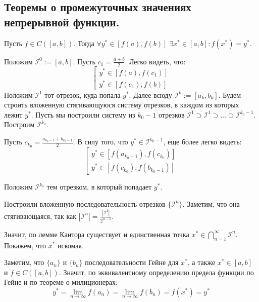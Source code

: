 \subsection{Теоремы о промежуточных значениях непрерывной функции.}

 Пусть $f \in C([a, b])$. 
Тогда $\forall y^* \in \left[f(a), f(b)\right] \; \exists x^* \in [a, b]: f(x^*) = y^*$.

\Proof

Положим $\mathcal{I}^0 := [a, b]$. Пусть $c_1 = \frac{a + b}{2}$. Легко видеть, что:
\begin{equation*}
    \left[
    \begin{array}{l}
        y^* \in [f(a), f(c_1)] \\
        y^* \in [f(c_1), f(b)]
    \end{array}
    \right.
\end{equation*}
Положим $\mathcal{I}^1$ тот отрезок, куда попала $y^*$. Далее всюду $\mathcal{I}^k := [a_k, b_k]$. 
Будем строить вложенную стягивающуюся систему отрезков, в каждом из которых лежит $y^*$.
Пусть мы построили систему из $k_0 - 1$ отрезков $\mathcal{I}^1 \supset \mathcal{I}^1 \supset \dots \supset \mathcal{I}^{k_0 - 1}$. Построим $\mathcal{I}^{k_0}$.

Пусть $c_{k_0} = \frac{a_{k_0 - 1} + b_{k_0 - 1}}{2}$. В силу того, что $y^* \in \mathcal{I}^{k_0 - 1}$, еще более легко видеть:
\begin{equation*}
    \left[
    \begin{array}{l}
        y^* \in [f(a_{k_0 - 1}), f(c_{k_0})] \\
        y^* \in [f(c_{k_0}), f(b_{k_0 - 1})]
    \end{array}
    \right.
\end{equation*}

Положим $\mathcal{I}^{k_0}$ тем отрезком, в который попадает $y^*$.

Построили вложенную последовательность отрезков $\{\mathcal{I}^{n}\}$. Заметим, что она стягивающаяся, так как $|\mathcal{I}^{n}| = \frac{|\mathcal{I}^{1}|}{2^{n - 1}}$.

Значит, по лемме Кантора существует и единственная точка $x^* \in \bigcap\limits_{n=1}^\infty \mathcal{I}^{n}$. Покажем, что $x^*$ искомая.

Заметим, что $\{a_n\}$ и $\{b_n\}$ последовательности Гейне для $x^*$, а также $x^* \in [a, b]$ и $f \in C([a, b])$. Значит, по эквивалентному определению предела функции по Гейне и по теореме о милиционерах:
\begin{equation*}
    y^* = \lim\limits_{n \to \infty} f(a_n) = \lim\limits_{n \to \infty} f(b_n) = f(x^*) = y^*
\end{equation*}

